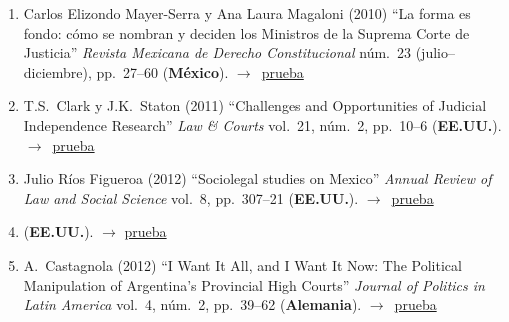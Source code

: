 \documentclass[12 pt, letter]{article}
\newenvironment{CitasMiTrabajo}{
    \begin{footnotesize}
    \begin{enumerate}[label={\footnotesize\emph{cita~\arabic*}},ref=\arabic*] %
        \setlength{\itemsep}{.1\itemsep}
        \setlength{\parskip}{.1\parskip}
    }{\end{enumerate}\end{footnotesize}}
\begin{document}

        \begin{CitasMiTrabajo}

        \item Carlos Elizondo Mayer-Serra y Ana Laura Magaloni (2010) ``La forma es fondo: c\'omo se nombran y deciden los Ministros de la Suprema Corte de Justicia'' \emph{Revista Mexicana de Derecho Constitucional} n\'um.~23 (julio--diciembre), pp.~27--60 (\textbf{M\'exico}). $\rightarrow$~\href{http://ericmagar.com/cv/cites/sanchMagalMagarChapter/MAGALONIELIZONDO2010cc23.pdf}{prueba}

        \item T.S.~Clark y J.K.~Staton  (2011) ``Challenges and Opportunities of Judicial Independence Research'' \emph{Law \& Courts} vol.~21, n\'um.~2, pp.~10--6 (\textbf{EE.UU.}). $\rightarrow$~\href{http://ericmagar.com/cv/cites/sanchMagalMagarChapter/clark.staton2011.pdf}{prueba}

        \item Julio R\'ios Figueroa (2012) ``Sociolegal studies on Mexico'' \emph{Annual Review of Law and Social Science} vol.~8, pp.~307--21 (\textbf{EE.UU.}). $\rightarrow$~\href{http://ericmagar.com/cv/cites/sanchMagalMagarChapter/riosSociolegalMex2012.pdf}{prueba}

        \item {} (\textbf{EE.UU.}). $\rightarrow$ \href{http://ericmagar.com/cv/cites/sanchMagalMagarChapter/carroll.tiedeVotingTribChile2012jhr.pdf}{prueba}

        \item A.~Castagnola (2012) ``I Want It All, and I Want It Now: The Political Manipulation of Argentina's Provincial High Courts'' \emph{Journal of Politics in Latin America} vol.~4, n\'um.~2, pp.~39--62 (\textbf{Alemania}). $\rightarrow$~\href{http://ericmagar.com/cv/cites/sanchMagalMagarChapter/castagnolaArgProvCourts2012jpla.pdf}{prueba}


\end{CitasMiTrabajo}
\end{document}
